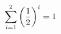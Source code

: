 \documentclass[preview]{standalone}
\begin{document}
\begin{align*}
\sum_{i=1}^{ 2 } \left({ 1 } \over {2} \right)^i = { 1 }
\end{align*}
\end{document}

